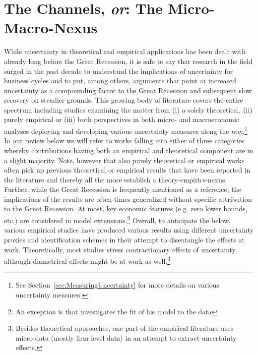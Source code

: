 \documentclass[a4paper,11pt,listof=nochaptergap,oneside,pointednumbers,bibtotoc,bigheadings,liststotoc]{scrbook}
\begin{document}
\chapter{The Channels, \textit{or}: The Micro-Macro-Nexus}
\label{sec:UncertaintyandBusinessCyclesRelatedLiterature}

While uncertainty in theoretical and empirical applications has been dealt with already long before the Great Recession, it is safe to say that research in the field surged in the past decade to understand the implications of uncertainty for business cycles and to put, among others, arguments that point at increased uncertainty as a compounding factor to the Great Recession and subsequent slow recovery on steadier grounds. This growing body of literature covers the entire spectrum including studies examining the matter from (i) a solely theoretical, (ii) purely empirical or (iii) both perspectives in both micro- and macroeconomic analyses deploying and developing various uncertainty measures along the way.\footnote{See Section~\ref{sec:MeasuringUncertainty} for more details on various uncertainty measures.} In our review below we will refer to works falling into either of three categories whereby contributions having both an empirical and theoretical component are in a slight majority.  Note, however that also purely theoretical or empirical works often pick up previous theoretical or empirical results that have been reported in the literature and thereby all the more establish a theory-empirics-nexus. Further, while the Great Recession is frequently mentioned as a reference, the implications of the results are often-times generalized without specific attribution to the Great Recession. At most, key economic features (e.g. zero lower bounds, etc.) are considered in model extensions.\footnote{An exception is \citet{schaal:17} that investigates the fit of his model to the data  } Overall, to anticipate the below, various empirical studies have produced various results using different uncertainty proxies and identification schemes in their attempt to disentangle the effects at work. Theoretically, most studies stress contractionary effects of uncertainty although diametrical effects might be at work as well.\footnote{Besides theoretical approaches, one part of the empirical literature uses micro-data (mostly firm-level data) in an attempt to extract uncertainty effects.}
\end{document}
